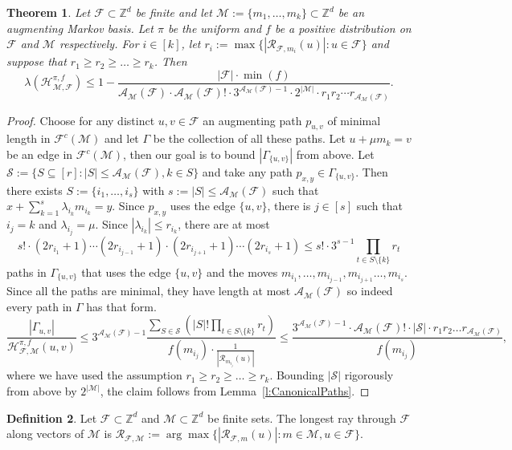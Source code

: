 \documentclass[11pt]{amsart}
\newtheorem{thm}{Theorem}[section]
\theoremstyle{definition}
\newtheorem{defn}[thm]{Definition}
\numberwithin{equation}{section}
\newcommand{\ring}[1]{\ensuremath{\mathbb{#1}}}
\renewcommand{\>}{\rangle}
\newcommand{\<}{\langle}
\newcommand{\0}{\mathbf{0}}
\newcommand{\1}{\mathbf{1}}
\newcommand{\2}{\mathbf{2}}
\newcommand\ZZ{\ring{Z}}
\newcommand\cA{{\mathcal A}}
\newcommand\cF{{\mathcal F}}
\newcommand\cM{{\mathcal M}}
\newcommand{\ray}[2]{\mathcal{R}_{#2}(#1)}
\newcommand{\longestRay}[2]{\mathcal{R}_{#1,#2}}
\newcommand{\polyray}[3]{\mathcal{R}_{#3,#2}(#1)}
\newcommand{\heatbath}[4]{\mathcal{H}^{#1,#2}_{#3,#4}}
\newcommand{\auglen}[2]{\cA_{#1}(#2)}
\begin{document}
\begin{thm}\label{t:MixingofAugmentingMarkovBases}
Let $\cF\subset\ZZ^d$ be finite and let
$\cM:=\{m_1,\dots,m_k\}\subset\ZZ^d$ be an augmenting Markov
basis. Let $\pi$ be the uniform and $f$ be a positive
distribution on $\cF$ and $\cM$ respectively. For $i\in[k]$, let
$r_i:=\max\{|\polyray{u}{m_i}{\cF}|:u\in\cF\}$ 
and suppose that $r_1\ge r_2\ge\dots\ge r_k$. Then
\begin{equation*}
\lambda(\heatbath{\pi}{f}{\cM}{\cF})\le1-\frac{|\cF|\cdot\min(f)}{\auglen{\cM}{\cF}\cdot\auglen{\cM}{\cF}!\cdot
3^{\auglen{\cM}{\cF}-1}\cdot2^{|\cM|}\cdot r_1r_2\cdots
r_{\auglen{\cM}{\cF}}}.
\end{equation*}
\end{thm}
\begin{proof}
Choose for any distinct
$u,v\in\cF$ an augmenting path $p_{u,v}$ of minimal length in
$\cF^c(\cM)$ and let $\Gamma$ be the collection of all
these paths. Let $u+\mu m_k=v$ be an edge in
$\cF^c(\cM)$, then our goal is to bound $|\Gamma_{\{u,v\}}|$ from
above. Let $\mathcal{S}:=\{S\subseteq[r]: |S|\le\auglen{\cM}{\cF},
k\in S\}$ and take any path $p_{x,y}\in\Gamma_{\{u,v\}}$. Then there exists
$S:=\{i_1,\dots,i_s\}$ with $s:=|S|\le\auglen{\cM}{\cF}$ such that
$x+\sum_{k=1}^s\lambda_{i_k}m_{i_k}=y$. Since $p_{x,y}$ uses the edge
$\{u,v\}$, there is $j\in[s]$ such that $i_j=k$ and
$\lambda_{i_j}=\mu$. Since $|\lambda_{i_k}|\le r_{i_k}$, there are at
most  
$$s!\cdot (2r_{i_1}+1)\cdots (2r_{i_{j-1}}+1)\cdot(2r_{i_{j+1}}+1)\cdots
(2r_{i_s}+1)\le
s!\cdot 3^{s-1}\prod_{t\in S\setminus\{k\}}r_{t}$$
paths in
$\Gamma_{\{u,v\}}$ that uses the edge $\{u,v\}$ and the moves
$m_{i_1},\dots,m_{i_{j-1}},m_{i_{j+1}}\dots,m_{i_s}$. Since all the
paths are minimal, they have length at most $\auglen{\cM}{\cF}$ so
indeed every path in $\Gamma$ has that form.
\begin{equation*}
\frac{|\Gamma_{u,v}|}{\heatbath{\pi}{f}{\cF}{\cM}(u,v)}\le
3^{\auglen{\cM}{\cF}-1}\frac{\sum_{S\in\mathcal{S}}\left(|S|!\prod_{t\in
S\setminus\{k\}}r_{t}\right)}{f(m_{i_j})\cdot\frac{1}{|\ray{u}{m_{i_j}}|}}\le\frac{3^{\auglen{\cM}{\cF}-1}\cdot
\auglen{\cM}{\cF}!\cdot|\mathcal{S}|\cdot
r_1r_2\dots r_{\auglen{\cM}{\cF}}}{f(m_{i_j})},
\end{equation*}
where we have used the assumption $r_1\ge r_2\ge \dots\ge r_k$.
Bounding $|\mathcal{S}|$ rigorously from above by $2^{|\cM|}$, the claim follows
from Lemma~\ref{l:CanonicalPaths}.
\end{proof}

\begin{defn}
Let $\cF\subset\ZZ^d$ and $\cM\subset\ZZ^d$ be finite sets. The longest
ray through $\cF$ along vectors of $\cM$ is
$\longestRay{\cF}{\cM}:=\arg\max\{|\polyray{u}{m}{\cF}|: m\in\cM, u\in
\cF\}$.
\end{defn}
\end{document}
